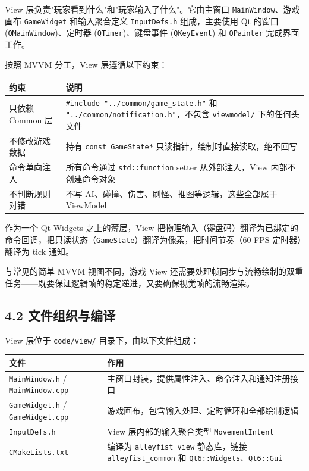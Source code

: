 \documentclass[12pt,fontset=none]{ctexart}
\begin{document}
View 层负责"玩家看到什么"和"玩家输入了什么"。它由主窗口 \texttt{MainWindow}、游戏画布 \texttt{GameWidget} 和输入聚合定义 \texttt{InputDefs.h} 组成，主要使用 Qt 的窗口 (\texttt{QMainWindow})、定时器 (\texttt{QTimer})、键盘事件 (\texttt{QKeyEvent}) 和 \texttt{QPainter} 完成界面工作。

按照 MVVM 分工，View 层遵循以下约束：

\begin{longtable}{l l}
\toprule
\textbf{约束} & \textbf{说明} \\
\midrule
\endhead
只依赖 Common 层 & \texttt{\#include "../common/game\_state.h"} 和 \texttt{"../common/notification.h"}，不包含 \texttt{viewmodel/} 下的任何头文件 \\
不修改游戏数据 & 持有 \texttt{const GameState*} 只读指针，绘制时直接读取，绝不回写 \\
命令单向注入 & 所有命令通过 \texttt{std::function} setter 从外部注入，View 内部不创建命令对象 \\
不判断规则对错 & 不写 AI、碰撞、伤害、刷怪、推图等逻辑，这些全部属于 ViewModel \\
\bottomrule
\end{longtable}

作为一个 Qt Widgets 之上的薄层，View 把物理输入（键盘码）翻译为已绑定的命令回调，把只读状态（\texttt{GameState}）翻译为像素，把时间节奏（60 FPS 定时器）翻译为 tick 通知。

与常见的简单 MVVM 视图不同，游戏 View 还需要处理帧同步与流畅绘制的双重任务——既要保证逻辑帧的稳定递进，又要确保视觉帧的流畅渲染。


\subsection{4.2 文件组织与编译}

View 层位于 \texttt{code/view/} 目录下，由以下文件组成：

\begin{longtable}{l l}
\toprule
\textbf{文件} & \textbf{作用} \\
\midrule
\endhead
\texttt{MainWindow.h} / \texttt{MainWindow.cpp} & 主窗口封装，提供属性注入、命令注入和通知注册接口 \\
\texttt{GameWidget.h} / \texttt{GameWidget.cpp} & 游戏画布，包含输入处理、定时循环和全部绘制逻辑 \\
\texttt{InputDefs.h} & View 层内部的输入聚合类型 \texttt{MovementIntent} \\
\texttt{CMakeLists.txt} & 编译为 \texttt{alleyfist\_view} 静态库，链接 \texttt{alleyfist\_common} 和 \texttt{Qt6::Widgets}、\texttt{Qt6::Gui} \\
\bottomrule
\end{longtable}
\end{document}
